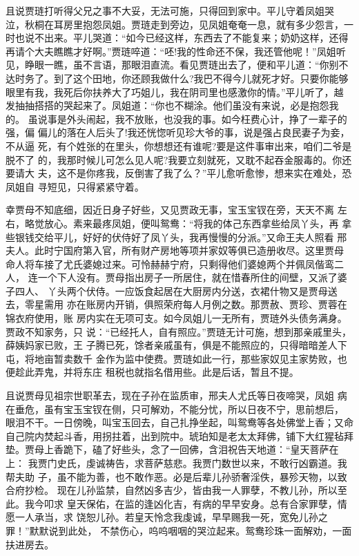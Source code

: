 且说贾琏打听得父兄之事不大妥，无法可施，只得回到家中。平儿守着凤姐哭
泣，秋桐在耳房里抱怨凤姐。贾琏走到旁边，见凤姐奄奄一息，就有多少怨言，一
时也说不出来。平儿哭道：“如今已经这样，东西去了不能复来；奶奶这样，还得
再请个大夫瞧瞧才好啊。”贾琏啐道：“呸!我的性命还不保，我还管他呢！”凤姐听
见，睁眼一瞧，虽不言语，那眼泪直流。看见贾琏出去了，便和平儿道：“你别不
达时务了。到了这个田地，你还顾我做什么?我巴不得今儿就死才好。只要你能够
眼里有我，我死后你扶养大了巧姐儿，我在阴司里也感激你的情。”平儿听了，越
发抽抽搭搭的哭起来了。凤姐道：“你也不糊涂。他们虽没有来说，必是抱怨我的。
虽说事是外头闹起，我不放账，也没我的事。如今枉费心计，挣了一辈子的强，偏
偏儿的落在人后头了!我还恍惚听见珍大爷的事，说是强占良民妻子为妾，不从逼
死，有个姓张的在里头，你想想还有谁呢?要是这件事审出来，咱们二爷是脱不了
的，我那时候儿可怎么见人呢?我要立刻就死，又耽不起吞金服毒的。你还要请大
夫，这不是你疼我，反倒害了我了么？”平儿愈听愈惨，想来实在难处，恐凤姐自
寻短见，只得紧紧守着。

幸贾母不知底细，因近日身子好些，又见贾政无事，宝玉宝钗在旁，天天不离
左右，略觉放心。素来最疼凤姐，便叫鸳鸯：“将我的体己东西拿些给凤丫头，再
拿些银钱交给平儿，好好的伏侍好了凤丫头，我再慢慢的分派。”又命王夫人照看
邢夫人。此时宁国府第入官，所有财产房地等项并家奴等俱已造册收尽。这里贾母
命人将车接了尤氏婆媳过来。可怜赫赫宁府，只剩得他们婆媳两个并佩凤偕鸾二人，
连一个下人没有。贾母指出房子一所居住，就在惜春所住的间壁，又派了婆子四人、
丫头两个伏侍。一应饭食起居在大厨房内分送，衣裙什物又是贾母送去，零星需用
亦在账房内开销，俱照荣府每人月例之数。那贾赦、贾珍、贾蓉在锦衣府使用，账
房内实在无项可支。如今凤姐儿一无所有，贾琏外头债务满身。贾政不知家务，只
说：“已经托人，自有照应。”贾琏无计可施，想到那亲戚里头，薛姨妈家已败，王
子腾已死，馀者亲戚虽有，俱是不能照应的，只得暗暗差人下屯，将地亩暂卖数千
金作为监中使费。贾琏如此一行，那些家奴见主家势败，也便趁此弄鬼，并将东庄
租税也就指名借用些。此是后话，暂且不提。

且说贾母见祖宗世职革去，现在子孙在监质审，邢夫人尤氏等日夜啼哭，凤姐
病在垂危，虽有宝玉宝钗在侧，只可解劝，不能分忧，所以日夜不宁，思前想后，
眼泪不干。一日傍晚，叫宝玉回去，自己扎挣坐起，叫鸳鸯等各处佛堂上香；又命
自己院内焚起斗香，用拐拄着，出到院中。琥珀知是老太太拜佛，铺下大红猩毡拜
垫。贾母上香跪下，磕了好些头，念了一回佛，含泪祝告天地道：“皇天菩萨在上：
我贾门史氏，虔诚祷告，求菩萨慈悲。我贾门数世以来，不敢行凶霸道。我帮夫助
子，虽不能为善，也不敢作恶。必是后辈儿孙骄奢淫佚，暴殄天物，以致合府抄检。
现在儿孙监禁，自然凶多吉少，皆由我一人罪孽，不教儿孙，所以至此。我今叩求
皇天保佑，在监的逢凶化吉，有病的早早安身。总有合家罪孽，情愿一人承当，求
饶恕儿孙。若皇天怜念我虔诚，早早赐我一死，宽免儿孙之罪！”默默说到此处，
不禁伤心，呜呜咽咽的哭泣起来。鸳鸯珍珠一面解劝，一面扶进房去。

